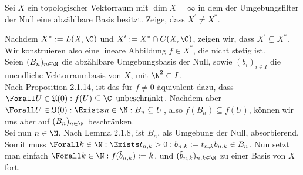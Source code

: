 \begin{exercise}

Sei $X$ ein topologischer Vektorraum mit $\dim{X} = \infty$ in dem der Umgebungsfilter der Null eine abzählbare Basis besitzt.
Zeige, dass $X^\prime \neq X^\ast$.

\end{exercise}

\begin{solution}

Nachdem $X^\ast := L(X, \C)$ und $X^\prime := X^\ast \cap C(X, \C)$, zeigen wir, dass $X^\prime \subsetneq X^\ast$.
Wir konstruieren also eine lineare Abbildung $f \in X^\ast$, die nicht stetig ist. \\

Seien $(B_n)_{n \in \N}$ die abzählbare Umgebungsbasis der Null, sowie $(b_i)_{i \in I}$ die unendliche Vektorraumbasis von $X$, mit $\N^2 \subset I$. \\

Nach Proposition 2.1.14, ist das für $f \neq 0$ äquivalent dazu, dass $\Forall U \in \mathfrak{U}(0): f(U) \subseteq \C \enspace \text{unbeschränkt}$.
Nachdem aber $\Forall U \in \mathfrak{U}(0): \Exists n \in \N: B_n \subseteq U$, also $f(B_n) \subseteq f(U)$, können wir uns aber auf $(B_n)_{n \in \N}$ beschränken. \\

Sei nun $n \in \N$.
Nach Lemma 2.1.8, ist $B_n$, als Umgebung der Null, absorbierend.
Somit muss $\Forall k \in \N: \Exists t_{n,k} > 0: \tilde{b}_{n,k} := t_{n,k} b_{n,k} \in B_n$.
Nun setzt man einfach $\Forall k \in \N: f(\tilde{b}_{n,k}) := k$, und $(\tilde{b}_{n,k})_{n,k \in \N}$ zu einer Basis von $X$ fort.

\end{solution}
